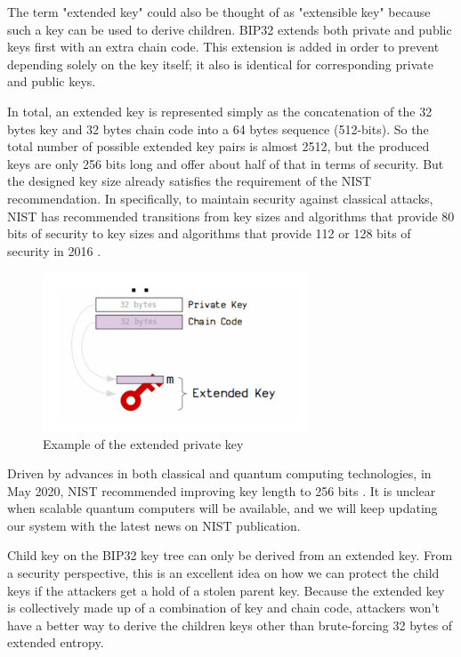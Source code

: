 The term "extended key" could also be thought of as "extensible key" because such a key can be used to derive children. BIP32 extends both private and public keys first with an extra chain code. This extension is added in order to prevent depending solely on the key itself; it also is identical for corresponding private and public keys.

In total, an extended key is represented simply as the concatenation of the 32 bytes key and 32 bytes chain code into a 64 bytes sequence (512-bits). So the total number of possible extended key pairs is almost 2512, but the produced keys are only 256 bits long and offer about half of that in terms of security. But the designed key size already satisfies the requirement of the NIST recommendation. In specifically, to maintain security against classical attacks, NIST has recommended transitions from key sizes and algorithms that provide 80 bits of security to key sizes and algorithms that provide 112 or 128 bits of security in 2016 \cite{Barker2019}.

\begin{figure}[ht!]
    \centering
    \includegraphics[width=0.7\textwidth]{images/extended_key.png}
    \caption[Example of the extended private key]{Example of the extended private key \cite{learnme}}
    \label{fig:extended_key}
\end{figure}

Driven by advances in both classical and quantum computing technologies, in May 2020, NIST recommended improving key length to 256 bits \cite{Barker2020}. It is unclear when scalable quantum computers will be available, and we will keep updating our system with the latest news on NIST publication.

Child key on the BIP32 key tree can only be derived from an extended key. From a security perspective, this is an excellent idea on how we can protect the child keys if the attackers get a hold of a stolen parent key. Because the extended key is collectively made up of a combination of key and chain code, attackers won’t have a better way to derive the children keys other than brute-forcing 32 bytes of extended entropy.

